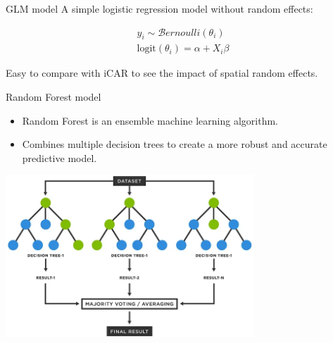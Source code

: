 \documentclass[10pt,table,dvipsnames,compress]{beamer}
\begin{document}
\begin{frame}[label={sec:org599fb42}]{GLM model}
A simple logistic regression model without random effects:

\begin{equation*}
\begin{split}
  y_i \sim \mathcal{B}ernoulli(\theta_i)\\
  \text{logit}(\theta_i) = \alpha + X_i \beta
\end{split}
\end{equation*}

Easy to compare with iCAR to see the impact of spatial random effects.
\end{frame}

\begin{frame}[label={sec:org52dbe2f}]{Random Forest model}
\begin{itemize}
\item Random Forest is an ensemble machine learning algorithm.
\item Combines multiple decision trees to create a more robust and accurate predictive model.
\end{itemize}

\begin{center}
\includegraphics[width=0.7\textwidth]{figs/random_forest.png}
\end{center}
\end{frame}
\end{document}
